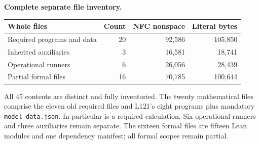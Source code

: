 \documentclass[11pt,a4paper]{article}
\begin{document}
\textbf{Complete separate file inventory.}
\begin{center}\small\begin{tabular}{lrrr}\toprule
Whole files & Count & NFC nonspace & Literal bytes\\\midrule
Required programs and data & 20 & 92,586 & 105,850\\
Inherited auxiliaries & 3 & 16,581 & 18,741\\
Operational runners & 6 & 26,056 & 28,439\\
Partial formal files & 16 & 70,785 & 100,644\\
\bottomrule\end{tabular}\end{center}
All 45 contents are distinct and fully inventoried. The twenty mathematical files comprise the eleven old required files and L121's eight programs plus mandatory \texttt{model\_data.json}. In particular  is a required calculation. Six operational runners and three auxiliaries remain separate. The sixteen formal files are fifteen Lean modules and one dependency manifest; all formal scopes remain partial.
\end{document}
